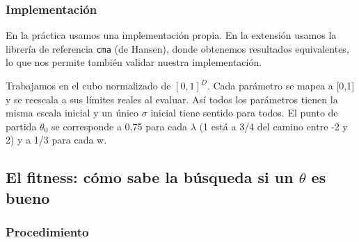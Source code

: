 \subsubsection{Implementación}
En la práctica usamos una implementación propia. En la extensión usamos la librería de referencia \texttt{cma} (de Hansen), donde obtenemos resultados equivalentes, lo que nos permite también validar nuestra implementación. 

Trabajamos en el cubo normalizado de $[0,1]^D$. Cada parámetro se mapea a [0,1] y se reescala a sus límites reales al evaluar. Así todos los parámetros tienen la misma escala inicial y un único $\sigma$ inicial tiene sentido para todos. El punto de partida $\theta_{0}$ se corresponde a 0,75 para cada $\lambda$ (1 está a 3/4 del camino entre -2 y 2) y a 1/3 para cada w. 

\subsection{El fitness: cómo sabe la búsqueda si un $\theta$ es bueno}
\subsubsection{Procedimiento}

